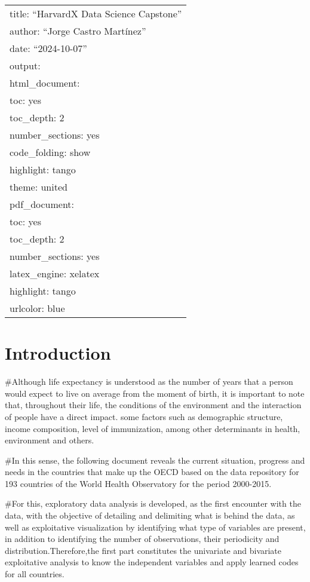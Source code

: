 \documentclass[
]{article}
\author{}
\date{\vspace{-2.5em}}
\begin{document}
\begin{longtable}[]{@{}l@{}}
\toprule\noalign{}
\endhead
\bottomrule\noalign{}
\endlastfoot
title: ``HarvardX Data Science Capstone'' \\
author: ``Jorge Castro Martínez'' \\
date: ``2024-10-07'' \\
output: \\
html\_document: \\
toc: yes \\
toc\_depth: 2 \\
number\_sections: yes \\
code\_folding: show \\
highlight: tango \\
theme: united \\
pdf\_document: \\
toc: yes \\
toc\_depth: 2 \\
number\_sections: yes \\
latex\_engine: xelatex \\
highlight: tango \\
urlcolor: blue \\
\end{longtable}

\newpage

\section{Introduction}\label{introduction}

\#Although life expectancy is understood as the number of years that a
person would expect to live on average from the moment of birth, it is
important to note that, throughout their life, the conditions of the
environment and the interaction of people have a direct impact. some
factors such as demographic structure, income composition, level of
immunization, among other determinants in health, environment and
others.

\#In this sense, the following document reveals the current situation,
progress and needs in the countries that make up the OECD based on the
data repository for 193 countries of the World Health Observatory for
the period 2000-2015.

\#For this, exploratory data analysis is developed, as the first
encounter with the data, with the objective of detailing and delimiting
what is behind the data, as well as exploitative visualization by
identifying what type of variables are present, in addition to
identifying the number of observations, their periodicity and
distribution.Therefore,the first part constitutes the univariate and
bivariate exploitative analysis to know the independent variables and
apply learned codes for all countries.
\end{document}
